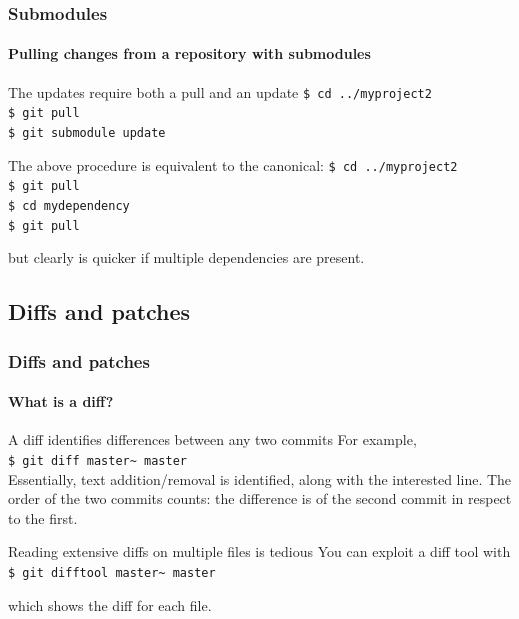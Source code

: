 \begin{frame}
\frametitle{Submodules}
\framesubtitle{Pulling changes from a repository with submodules}

\begin{block}{The updates require both a pull and an update}
\texttt{\$ cd ../myproject2} \\
\texttt{\$ git pull} \\
\texttt{\$ git submodule update}
\end{block}
\pause
\begin{block}{The above procedure is equivalent to the canonical:}
\texttt{\$ cd ../myproject2} \\
\texttt{\$ git pull} \\
\texttt{\$ cd mydependency} \\
\texttt{\$ git pull}

\medskip
but clearly is quicker if multiple dependencies are present.
\end{block}

\end{frame}

\subsection{Diffs and patches}

\begin{frame}
\frametitle{Diffs and patches}
\framesubtitle{What is a diff?}

\begin{block}{A diff identifies differences between any two commits}
For example, \\
\texttt{\$ git diff master\textasciitilde{} master} \\

\medskip
Essentially, text addition/removal is identified, along with the interested line. The order of the two commits counts: the difference is of the second commit in respect to the first. 
\end{block}

\pause
\begin{block}{Reading extensive diffs on multiple files is tedious}
You can exploit a diff tool with \\
\texttt{\$ git difftool master\textasciitilde{} master}

\medskip
which shows the diff for each file.
\end{block}

\end{frame}

